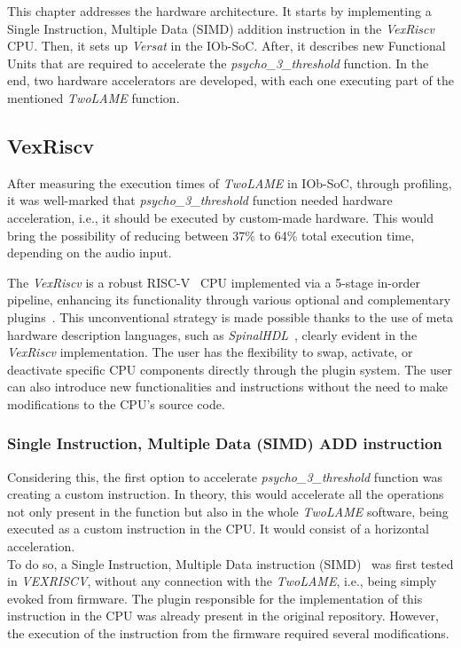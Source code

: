 
This chapter addresses the hardware architecture. It starts by implementing a Single Instruction, Multiple Data (SIMD) addition instruction in the \textit{VexRiscv} CPU. Then, it sets up \textit{Versat} in the IOb-SoC. After, it describes new Functional Units that are required to accelerate the \textit{psycho\_3\_threshold} function. In the end, two hardware accelerators are developed, with each one executing part of the mentioned \textit{TwoLAME} function.

\subsection{VexRiscv}
After measuring the execution times of \textit{TwoLAME} in IOb-SoC, through profiling, it was well-marked that \textit{psycho\_3\_threshold} function needed hardware acceleration, i.e., it should be executed by custom-made hardware. This would bring the possibility of reducing between 37\% to 64\% total execution time, depending on the audio input.

The \textit{VexRiscv} is a robust RISC-V~\cite{bib:riscvmanual} CPU implemented via a 5-stage in-order pipeline, enhancing its functionality through various optional and complementary plugins~\cite{vexriscv}. This unconventional strategy is made possible thanks to the use of meta hardware description languages, such as \textit{SpinalHDL}~\cite{bib:spinalhdl}, clearly evident in the \textit{VexRiscv} implementation. The user has the flexibility to swap, activate, or deactivate specific CPU components directly through the plugin system. The user can also introduce new functionalities and instructions without the need to make modifications to the CPU's source code.


\subsubsection{Single Instruction, Multiple Data (SIMD) ADD instruction}
Considering this, the first option to accelerate \textit{psycho\_3\_threshold} function was creating a custom instruction. In theory, this would accelerate all the operations not only present in the function but also in the whole \textit{TwoLAME} software, being executed as a custom instruction in the CPU. It would consist of a horizontal acceleration.\\
To do so, a Single Instruction, Multiple Data instruction (SIMD)~\cite{simd} was first tested in \textit{VEXRISCV}, without any connection with the \textit{TwoLAME}, i.e., being simply evoked from firmware. The plugin responsible for the implementation of this instruction in the CPU was already present in the original repository. However, the execution of the instruction from the firmware required several modifications.

